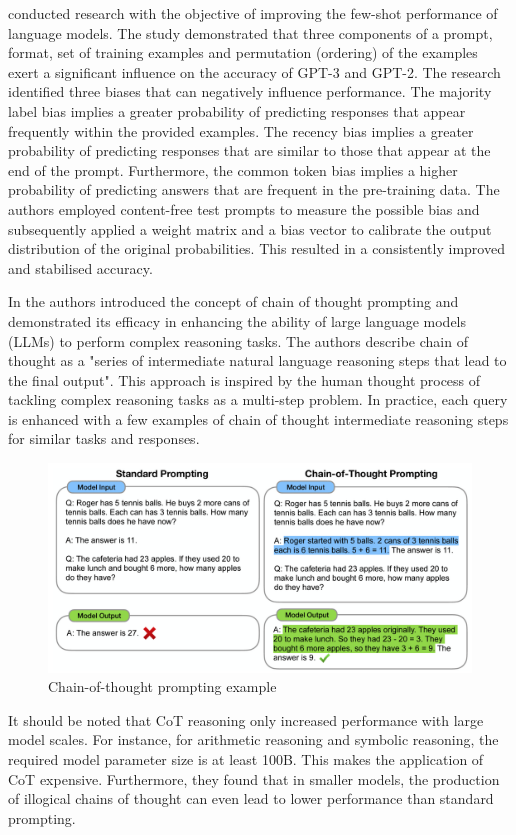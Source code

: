 \documentclass{article}
\begin{document}
\cite{zhao_calibrate_2021} conducted research with the objective of improving the few-shot performance of language models. The study demonstrated that three components of a prompt, format, set of training examples and permutation (ordering) of the examples exert a significant influence on the accuracy of GPT-3 and GPT-2. The research identified three biases that can negatively influence performance. The majority label bias implies a greater probability of predicting responses that appear frequently within the provided examples. The recency bias implies a greater probability of predicting responses that are similar to those that appear at the end of the prompt. Furthermore, the common token bias implies a higher probability of predicting answers that are frequent in the pre-training data. The authors employed content-free test prompts to measure the possible bias and subsequently applied a weight matrix and a bias vector to calibrate the output distribution of the original probabilities. This resulted in a consistently improved and stabilised accuracy.

In \cite{wei_chain--thought_2022}  the authors introduced the concept of chain of thought prompting and demonstrated its efficacy in enhancing the ability of large language models (LLMs) to perform complex reasoning tasks. The authors describe chain of thought as a "series of intermediate natural language reasoning steps that lead to the final output". This approach is inspired by the human thought process of tackling complex reasoning tasks as a multi-step problem. In practice, each query is enhanced with a few examples of chain of thought intermediate reasoning steps for similar tasks and responses.
\begin{figure}[h]
	\centering
	\includegraphics[width=0.7\linewidth]{CoTExample}
	\caption{Chain-of-thought prompting example\cite{wei_chain--thought_2022}}
	\label{fig:cotexample}
\end{figure}
It should be noted that CoT reasoning only increased performance with large model scales. For instance, for arithmetic reasoning and symbolic reasoning, the required model parameter size is at least 100B. This makes the application of CoT expensive. Furthermore, they found that in smaller models, the production of illogical chains of thought can even lead to lower performance than standard prompting.
\end{document}
